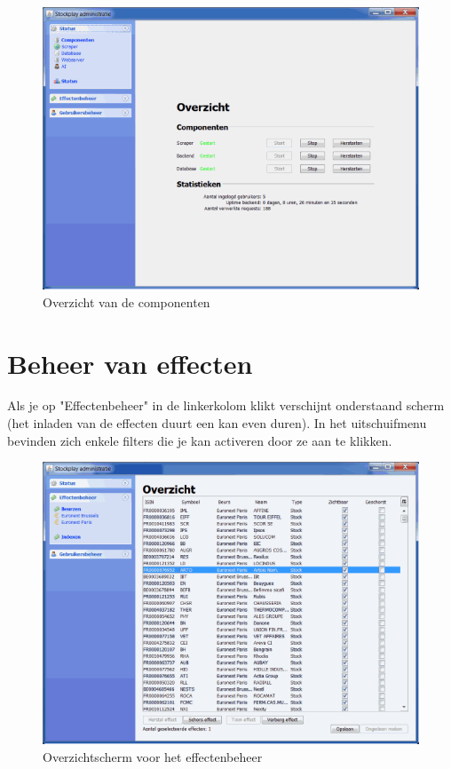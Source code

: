 \begin{figure}[h!]
	\centering
		\includegraphics[width=\textwidth]{images/handleiding/handleiding7.png}
	\caption{Overzicht van de componenten}
\end{figure}

\section{Beheer van effecten}

Als je op "Effectenbeheer" in de linkerkolom klikt verschijnt onderstaand scherm (het inladen van de effecten duurt een kan even duren).
In het uitschuifmenu bevinden zich enkele filters die je kan activeren door ze aan te klikken.

\begin{figure}[h!]
	\centering
		\includegraphics[width=\textwidth]{images/handleiding/handleiding6.png}
	\caption{Overzichtscherm voor het effectenbeheer}
\end{figure}

